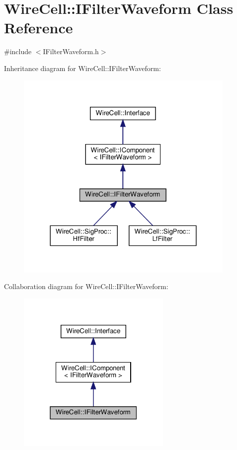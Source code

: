 \hypertarget{class_wire_cell_1_1_i_filter_waveform}{}\section{Wire\+Cell\+:\+:I\+Filter\+Waveform Class Reference}
\label{class_wire_cell_1_1_i_filter_waveform}


{\ttfamily \#include $<$I\+Filter\+Waveform.\+h$>$}



Inheritance diagram for Wire\+Cell\+:\+:I\+Filter\+Waveform\+:
\nopagebreak
\begin{figure}[H]
\begin{center}
\leavevmode
\includegraphics[width=300pt]{class_wire_cell_1_1_i_filter_waveform__inherit__graph}
\end{center}
\end{figure}


Collaboration diagram for Wire\+Cell\+:\+:I\+Filter\+Waveform\+:
\nopagebreak
\begin{figure}[H]
\begin{center}
\leavevmode
\includegraphics[width=210pt]{class_wire_cell_1_1_i_filter_waveform__coll__graph}
\end{center}
\end{figure}
